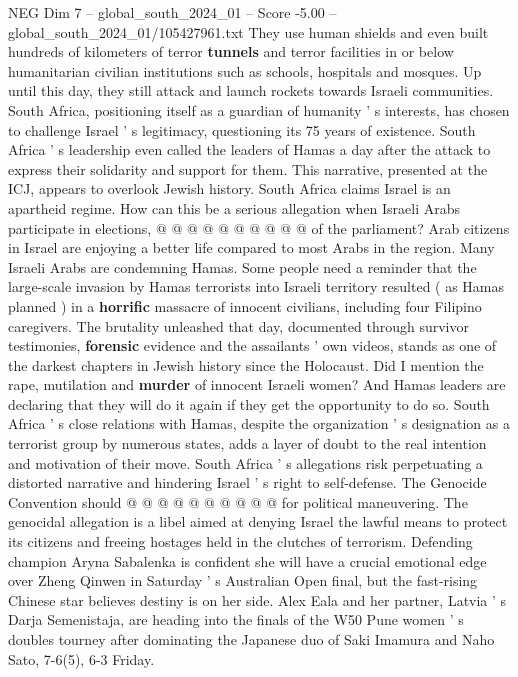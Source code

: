 \begin{textsample}{NEG Dim 7 – global\_south\_2024\_01 – Score -5.00 – global\_south\_2024\_01/105427961.txt}
They use human shields and even built hundreds of kilometers of terror \textbf{tunnels} and terror facilities in or below humanitarian civilian institutions such as schools, hospitals and mosques.
Up until this day, they still attack and launch rockets towards Israeli communities.
South Africa, positioning itself as a guardian of humanity ' s interests, has chosen to challenge Israel ' s legitimacy, questioning its 75 years of existence.
South Africa ' s leadership even called the leaders of Hamas a day after the attack to express their solidarity and support for them.
This narrative, presented at the ICJ, appears to overlook Jewish history.
South Africa claims Israel is an apartheid regime.
How can this be a serious allegation when Israeli Arabs participate in elections, @ @ @ @ @ @ @ @ @ @ of the parliament?
Arab citizens in Israel are enjoying a better life compared to most Arabs in the region.
Many Israeli Arabs are condemning Hamas.
Some people need a reminder that the large-scale invasion by Hamas terrorists into Israeli territory resulted ( as Hamas planned ) in a \textbf{horrific} massacre of innocent civilians, including four Filipino caregivers.
The brutality unleashed that day, documented through survivor testimonies, \textbf{forensic} evidence and the assailants ' own videos, stands as one of the darkest chapters in Jewish history since the Holocaust.
Did I mention the rape, mutilation and \textbf{murder} of innocent Israeli women?
And Hamas leaders are declaring that they will do it again if they get the opportunity to do so.
South Africa ' s close relations with Hamas, despite the organization ' s designation as a terrorist group by numerous states, adds a layer of doubt to the real intention and motivation of their move.
South Africa ' s allegations risk perpetuating a distorted narrative and hindering Israel ' s right to self-defense.
The Genocide Convention should @ @ @ @ @ @ @ @ @ @ for political maneuvering.
The genocidal allegation is a libel aimed at denying Israel the lawful means to protect its citizens and freeing hostages held in the clutches of terrorism.
Defending champion Aryna Sabalenka is confident she will have a crucial emotional edge over Zheng Qinwen in Saturday ' s Australian Open final, but the fast-rising Chinese star believes destiny is on her side.
Alex Eala and her partner, Latvia ' s Darja Semenistaja, are heading into the finals of the W50 Pune women ' s doubles tourney after dominating the Japanese duo of Saki Imamura and Naho Sato, 7-6(5), 6-3 Friday.

\end{textsample}
